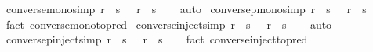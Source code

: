 \begin{isabellebody}
\isanewline
{}\isamarkupfalse%
\ converse{\isacharunderscore}{\kern0pt}mono{\isacharbrackleft}{\kern0pt}simp{\isacharbrackright}{\kern0pt}{\isacharcolon}{\kern0pt}\ {\isachardoublequoteopen}r{\isasyminverse}\ {\isasymsubseteq}\ s\ {\isasyminverse}\ {\isasymlongleftrightarrow}\ r\ {\isasymsubseteq}\ s{\isachardoublequoteclose}\isanewline
%
\isadelimproof
\ \ %
\endisadelimproof
%
\isatagproof
{}\isamarkupfalse%
\ auto%
\endisatagproof
{\isafoldproof}%
%
\isadelimproof
\isanewline
%
\endisadelimproof
\isanewline
{}\isamarkupfalse%
\ conversep{\isacharunderscore}{\kern0pt}mono{\isacharbrackleft}{\kern0pt}simp{\isacharbrackright}{\kern0pt}{\isacharcolon}{\kern0pt}\ {\isachardoublequoteopen}r{\isasyminverse}{\isasyminverse}\ {\isasymle}\ s\ {\isasyminverse}{\isasyminverse}\ {\isasymlongleftrightarrow}\ r\ {\isasymle}\ s{\isachardoublequoteclose}\isanewline
%
\isadelimproof
\ \ %
\endisadelimproof
%
\isatagproof
{}\isamarkupfalse%
\ {\isacharparenleft}{\kern0pt}fact\ converse{\isacharunderscore}{\kern0pt}mono{\isacharbrackleft}{\kern0pt}to{\isacharunderscore}{\kern0pt}pred{\isacharbrackright}{\kern0pt}{\isacharparenright}{\kern0pt}%
\endisatagproof
{\isafoldproof}%
%
\isadelimproof
\isanewline
%
\endisadelimproof
\isanewline
{}\isamarkupfalse%
\ converse{\isacharunderscore}{\kern0pt}inject{\isacharbrackleft}{\kern0pt}simp{\isacharbrackright}{\kern0pt}{\isacharcolon}{\kern0pt}\ {\isachardoublequoteopen}r{\isasyminverse}\ {\isacharequal}{\kern0pt}\ s\ {\isasyminverse}\ {\isasymlongleftrightarrow}\ r\ {\isacharequal}{\kern0pt}\ s{\isachardoublequoteclose}\isanewline
%
\isadelimproof
\ \ %
\endisadelimproof
%
\isatagproof
{}\isamarkupfalse%
\ auto%
\endisatagproof
{\isafoldproof}%
%
\isadelimproof
\isanewline
%
\endisadelimproof
\isanewline
{}\isamarkupfalse%
\ conversep{\isacharunderscore}{\kern0pt}inject{\isacharbrackleft}{\kern0pt}simp{\isacharbrackright}{\kern0pt}{\isacharcolon}{\kern0pt}\ {\isachardoublequoteopen}r{\isasyminverse}{\isasyminverse}\ {\isacharequal}{\kern0pt}\ s\ {\isasyminverse}{\isasyminverse}\ {\isasymlongleftrightarrow}\ r\ {\isacharequal}{\kern0pt}\ s{\isachardoublequoteclose}\isanewline
%
\isadelimproof
\ \ %
\endisadelimproof
%
\isatagproof
{}\isamarkupfalse%
\ {\isacharparenleft}{\kern0pt}fact\ converse{\isacharunderscore}{\kern0pt}inject{\isacharbrackleft}{\kern0pt}to{\isacharunderscore}{\kern0pt}pred{\isacharbrackright}{\kern0pt}{\isacharparenright}{\kern0pt}%
\endisatagproof
{\isafoldproof}%
%
\isadelimproof
\isanewline

\end{isabellebody}
